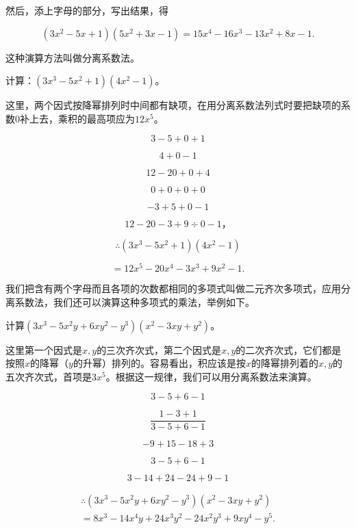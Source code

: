 然后，添上字母的部分，写出结果，得

\[
(3 x ^{2} - 5 x + 1) (5 x ^{2} + 3 x - 1) = 15 x ^{4} - 16 x ^{3} - 13 x ^{2} + 8 x - 1.
\]

这种演算方法叫做分离系数法。

 计算：\((3x^{3}-5x^{2}+1)(4x^{2}-1)\)。

这里，两个因式按降幂排列时中间都有缺项，在用分离系数法列式时要把缺项的系数0补上去，乘积的最高项应为\(12x^{5}\)。


\[
3 - 5 + 0 + 1
\]

\[
4 + 0 - 1
\]

\[
12 - 20 + 0 + 4
\]

\[
0 + 0 + 0 + 0
\]

\[
- 3 + 5 + 0 - 1
\]

\[
12 - 20 - 3 + 9 \div 0 - 1\text{，}
\]

\[
\therefore (3 x ^{3} - 5 x ^{2} + 1) (4 x ^{2} - 1)
\]

\[
= 12 x ^{5} - 20 x ^{4} - 3 x ^{3} + 9 x ^{2} - 1.
\]

我们把含有两个字母而且各项的次数都相同的多项式叫做二元齐次多项式，应用分离系数法，我们还可以演算这种多项式的乘法，举例如下。

 计算\((3x^{3}-5x^{2}y+6xy^{2}-y^{3})(x^{2}-3xy+y^{2})\)。

这里第一个因式是\(x, y\)的三次齐次式，第二个因式是\(x, y\)的二次齐次式，它们都是按照\(x\)的降幂（\(y\)的升幂）排列的。容易看出，积应该是按\(x\)的降幂排列着的\(x, y\)的五次齐次式，首项是\(3x^5\)。根据这一规律，我们可以用分离系数法来演算。


\[
3 - 5 + 6 - 1
\]

\[
\frac{1 - 3 + 1}{3 - 5 + 6 - 1}
\]

\[
- 9 + 15 - 18 + 3
\]

\[
3 - 5 + 6 - 1
\]

\[
3 - 14 + 24 - 24 + 9 - 1
\]

\[
\begin{array}{l} \therefore (3 x ^{3} - 5 x ^{2} y + 6 x y ^{2} - y ^{3}) (x ^{2} - 3 x y + y ^{2}) \\ = 8 x ^{3} - 14 x ^{4} y + 24 x ^{3} y ^{2} - 24 x ^{2} y ^{3} + 9 x y ^{4} - y ^{5}. \\ \end{array}
\]

